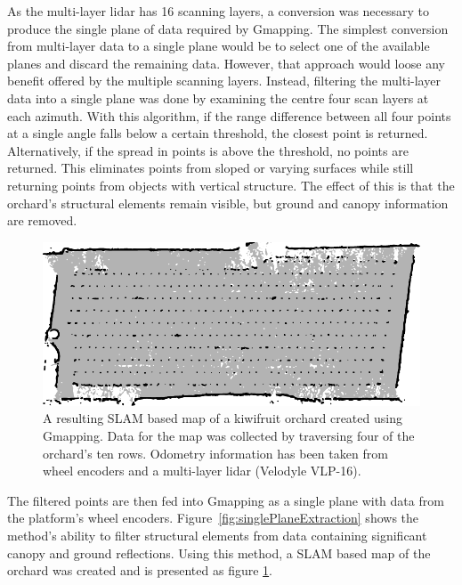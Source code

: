 \documentclass[preprint,authoryear,12pt]{elsarticle}
\begin{document}
        As the multi-layer lidar has 16 scanning layers, a conversion was necessary to produce the single plane of data required by Gmapping.
        The simplest conversion from multi-layer data to a single plane would be to select one of the available planes and discard the remaining data.
        However, that approach would loose any benefit offered by the multiple scanning layers.
        Instead, filtering the multi-layer data into a single plane was done by examining the centre four scan layers at each azimuth.
        With this algorithm, if the range difference between all four points at a single angle falls below a certain threshold, the closest point is returned.
        Alternatively, if the spread in points is above the threshold, no points are returned.
        This eliminates points from sloped or varying surfaces while still returning points from objects with vertical structure.
        The effect of this is that the orchard's structural elements remain visible, but ground and canopy information are removed.

        \begin{figure}[htb]
            \centering
            \includegraphics{imgs/gmapmap/gmapmap.pdf}
            \caption{
                A resulting SLAM based map of a kiwifruit orchard created using Gmapping.
                Data for the map was collected by traversing four of the orchard's ten rows.
                Odometry information has been taken from wheel encoders and a multi-layer lidar (Velodyle VLP-16).
            }
            \label{fig:gmapmap}
        \end{figure}

        The filtered points are then fed into Gmapping as a single plane with data from the platform's wheel encoders.
        Figure~\ref{fig:singlePlaneExtraction} shows the method's ability to filter structural elements from data containing significant canopy and ground reflections.
        Using this method, a SLAM based map of the orchard was created and is presented as figure \ref{fig:gmapmap}.
\end{document}

